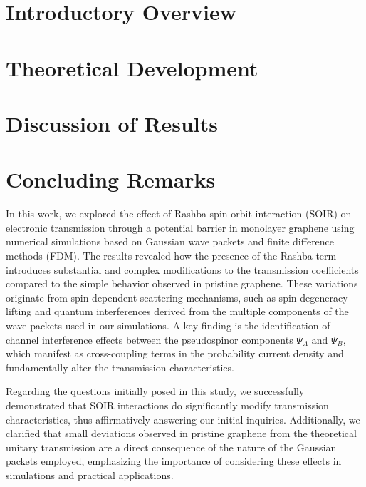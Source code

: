 \documentclass{../assets/templates/iopjournal}
\begin{document}

    \section{Introductory Overview}\label{sec:introduction}
    

    \section{Theoretical Development}\label{sec:development}
    

    \section{Discussion of Results}\label{sec:discussion-of-results}
    

    \section{Concluding Remarks}\label{sec:conclusions}

    In this work, we explored the effect of Rashba spin-orbit interaction (SOIR) on electronic transmission through a potential barrier in monolayer graphene using numerical simulations based on Gaussian wave packets and finite difference methods (FDM). The results revealed how the presence of the Rashba term introduces substantial and complex modifications to the transmission coefficients compared to the simple behavior observed in pristine graphene.
    These variations originate from spin-dependent scattering mechanisms, such as spin degeneracy lifting and quantum interferences derived from the multiple components of the wave packets used in our simulations.
    A key finding is the identification of channel interference effects between the pseudospinor components $\Psi_A$ and $\Psi_B$, which manifest as cross-coupling terms in the probability current density and fundamentally alter the transmission characteristics.

    Regarding the questions initially posed in this study, we successfully demonstrated that SOIR interactions do significantly modify transmission characteristics, thus affirmatively answering our initial inquiries.
    Additionally, we clarified that small deviations observed in pristine graphene from the theoretical unitary transmission are a direct consequence of the nature of the Gaussian packets employed, emphasizing the importance of considering these effects in simulations and practical applications.
\end{document}
